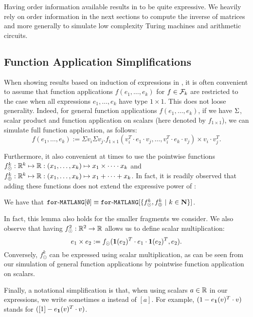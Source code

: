 

Having order information available results in \langfor to be quite expressive.
We heavily rely on order information in the next sections to compute the inverse of matrices and more generally to simulate low complexity Turing machines and arithmetic circuits.

\subsection{Function Application Simplifications}\label{sec:queries:simp}

When showing results based on induction of expressions in \langfor, it is often convenient to assume that function applications $f(e_1,\ldots,e_k)$ for $f\in\mathcal{F}_k$ are restricted to
the case when all expressions $e_1,\ldots,e_k$ have type $1\times 1$. This does not loose generality. Indeed,
for general function applications $f(e_1,\ldots,e_k)$, if we have $\Sigma$, scalar product and function application on scalars (here denoted by $f_{1\times 1}$), we can simulate full function application, as follows:
 $$
f(e_1,\ldots, e_k) :=\Sigma v_i \Sigma v_j. f_{1\times 1}(v_i^T\cdot e_1\cdot v_j, \ldots ,v_i^T\cdot e_k\cdot v_j) \times v_i\cdot v_j^T.
$$

Furthermore, it also convenient at times to use the pointwise functions
$f_\odot^k:\mathbb{R}^k\mapsto \mathbb{R}:(x_1,\ldots,x_k)\mapsto x_1\times\cdots \cdot x_k$ and 
$f_\oplus^k:\mathbb{R}^k\mapsto \mathbb{R}:(x_1,\ldots,x_k)\mapsto x_1+\cdots + x_k$. In fact, it is readily observed that adding these functions does not extend the expressive power of \langfor:
\begin{lemma}
\label{lm-prod-sum}
We have that $\texttt{for}\text{-}\texttt{MATLANG}[\emptyset] \equiv \texttt{for}\text{-}\texttt{MATLANG}[\{f_\odot^k,f_\oplus^k \ | \ k\in \mathbf{N}\}]$.
\end{lemma}
In fact, this lemma also holds for the smaller fragments we consider.
%
We also observe that having $f_\odot^2:\mathbb{R}^2\to\mathbb{R}$ allows us to define scalar multiplication:
$$
e_1\times e_2 :=f_{\odot}(\mathbf{1}(e_2)^T\cdot e_1 \cdot \mathbf{1}(e_2)^T, e_2).
$$
Conversely, $f_\odot^k$ can be expressed using scalar multiplication, as can be seen from our simulation of general function applications by pointwise function application on scalars.

Finally, a notational simplification is that, when using scalars $a\in\mathbb{R}$ in our expressions, we write sometimes
$a$ instead of $[a]$. For example,  $(1-e_{\mathbf{1}}(v)^T\cdot v)$ stands for  $([1]-e_{\mathbf{1}}(v)^T\cdot v)$.